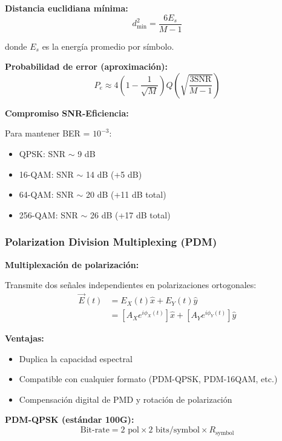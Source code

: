 \documentclass[11pt,a4paper]{article}
\begin{document}
\textbf{Distancia euclidiana mínima:}
\begin{equation}
    d_{\min}^2 = \frac{6E_s}{M - 1}
\end{equation}

donde $E_s$ es la energía promedio por símbolo.

\textbf{Probabilidad de error (aproximación):}
\begin{equation}
    P_e \approx 4\left(1 - \frac{1}{\sqrt{M}}\right)Q\left(\sqrt{\frac{3\text{SNR}}{M-1}}\right)
\end{equation}

\textbf{Compromiso SNR-Eficiencia:}

Para mantener BER = $10^{-3}$:
\begin{itemize}
    \item QPSK: SNR $\sim$ 9 dB
    \item 16-QAM: SNR $\sim$ 14 dB (+5 dB)
    \item 64-QAM: SNR $\sim$ 20 dB (+11 dB total)
    \item 256-QAM: SNR $\sim$ 26 dB (+17 dB total)
\end{itemize}

\subsubsection{Polarization Division Multiplexing (PDM)}

\textbf{Multiplexación de polarización:}

Transmite dos señales independientes en polarizaciones ortogonales:
\begin{align}
    \vec{E}(t) &= E_X(t)\hat{x} + E_Y(t)\hat{y} \\
    &= [A_X e^{i\phi_X(t)}]\hat{x} + [A_Y e^{i\phi_Y(t)}]\hat{y}
\end{align}

\textbf{Ventajas:}
\begin{itemize}
    \item Duplica la capacidad espectral
    \item Compatible con cualquier formato (PDM-QPSK, PDM-16QAM, etc.)
    \item Compensación digital de PMD y rotación de polarización
\end{itemize}

\textbf{PDM-QPSK (estándar 100G):}
\begin{equation}
    \text{Bit-rate} = 2 \text{ pol} \times 2 \text{ bits/symbol} \times R_{\text{symbol}}
\end{equation}
\end{document}
